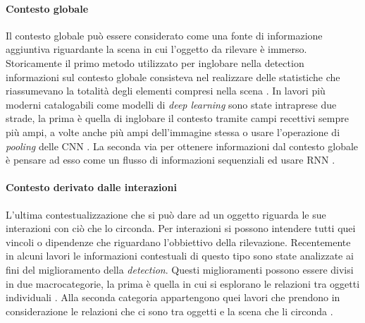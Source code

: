 \paragraph{Contesto globale}
Il contesto globale può essere considerato come una fonte di informazione aggiuntiva riguardante la scena in cui l'oggetto da rilevare è immerso. Storicamente il primo metodo utilizzato per inglobare nella detection informazioni sul contesto globale consisteva nel realizzare delle statistiche che riassumevano la totalità degli elementi compresi nella scena \cite{divvala2009empirical}. In lavori più moderni catalogabili come modelli di \textit{deep learning} sono state intraprese due strade, la prima è quella di inglobare il contesto tramite campi recettivi sempre più ampi, a volte anche più ampi dell'immagine stessa \cite{redmon2016you} o  usare l'operazione di \textit{pooling} delle \ac{CNN} \cite{li2018r}. La seconda via per ottenere informazioni dal contesto globale è pensare ad esso come un flusso di informazioni sequenziali ed usare \ac{RNN} \cite{bell2016inside, li2016attentive}. 
\paragraph{Contesto derivato dalle interazioni}
L'ultima contestualizzazione che si può dare ad un oggetto riguarda le sue interazioni con ciò che lo circonda. Per interazioni si possono intendere tutti quei vincoli o dipendenze che riguardano l'obbiettivo della rilevazione. Recentemente in alcuni lavori le informazioni contestuali di questo tipo sono state analizzate ai fini del miglioramento della \textit{detection}. Questi miglioramenti possono essere divisi in due macrocategorie, la prima è quella in cui si esplorano le relazioni tra oggetti individuali \cite{felzenszwalb2009object, desai2011discriminative, song2011contextualizing, chen2017spatial, hu2018relation}. Alla seconda categoria appartengono quei lavori che prendono in considerazione le relazioni che ci sono tra oggetti e la scena che li circonda  \cite{gupta2015exploring, liu2018structure}.

